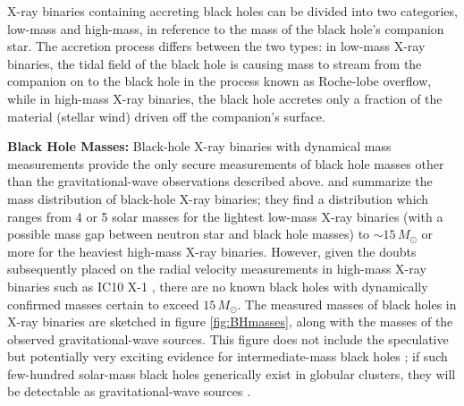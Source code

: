 \documentclass[iop,onecolumn]{revtex4}
\newcommand{\todo}[1]{\textcolor{red}{#1}}
\begin{document}
X-ray binaries containing accreting black holes can be divided into two categories, low-mass and high-mass, in reference to the mass of the black hole's companion star. The accretion process differs between the two types: in low-mass X-ray binaries, the tidal field of the black hole is causing mass to stream from the companion on to the black hole in the process known as Roche-lobe overflow, while in high-mass X-ray binaries, the black hole accretes only a fraction of the material (stellar wind) driven off the companion's surface.

\textbf{Black Hole Masses:} 
Black-hole X-ray binaries with dynamical mass measurements provide the only secure measurements of black hole masses other than the gravitational-wave observations described above.  \citet{Ozel:2010} and \citet{Farr:2011} summarize the mass distribution of black-hole X-ray binaries; they find a distribution which ranges from 4 or 5 solar masses for the lightest low-mass X-ray binaries (with a possible mass gap between neutron star and black hole masses) to $\sim 15\, M_\odot$ or more for the heaviest high-mass X-ray binaries.  However, given the doubts subsequently placed on the radial velocity measurements in high-mass X-ray binaries such as IC10 X-1 \citep{Laycock:2015}, there are no known black holes with dynamically confirmed masses certain to exceed $15\, M_\odot$.  The measured masses of black holes in X-ray binaries are sketched in figure \ref{fig:BHmasses}, along with the masses of the observed gravitational-wave sources.  This figure does not include the speculative but potentially very exciting evidence for intermediate-mass black holes \citep{MillerColbert:2004,Pasham:2014}; if such few-hundred solar-mass black holes generically exist in globular clusters, they will be detectable as gravitational-wave sources \citep[e.g.,][]{Mandel:2008,IMBBH:O1}.
\end{document}
